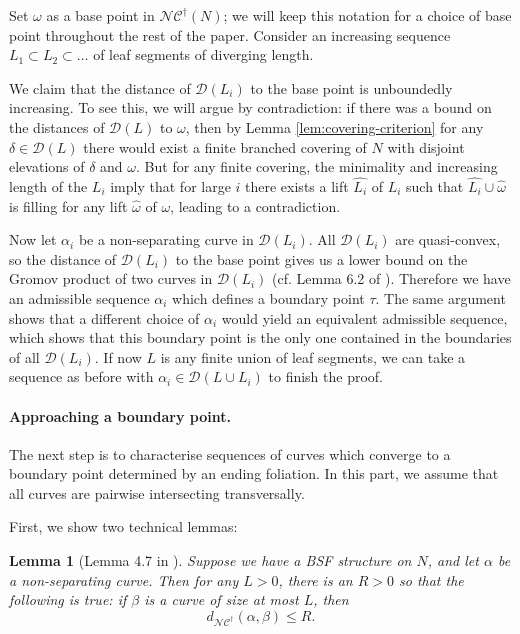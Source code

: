 \documentclass[a4paper]{article}
\newtheorem{lemma}[theorem]{Lemma}
\newcommand{\fncg}{\mathcal{NC}^\dagger}
\begin{document}
Set $\omega$ as a base point in $\fncg(N)$; 
we will keep this notation for a choice of base point throughout the rest of the paper.
Consider an increasing sequence $L_1 \subset L_2 \subset \dots$ of leaf segments of diverging length.

We claim that the distance of $\mathcal{D}(L_i)$ to the base point is unboundedly increasing.
To see this, we will argue by contradiction:
if there was a bound on the distances of $\mathcal{D}(L)$ to $\omega$, then by Lemma \ref{lem:covering-criterion} for any $ \delta \in \mathcal{D}(L) $ there would exist a finite branched covering of $N$ with disjoint elevations of $\delta$ and $\omega$.
But for any finite covering, the minimality and increasing length of the $L_i$ imply that for large $i$ there exists a lift $\hat{L_i}$ of $L_i$ such that $\hat{L_i}\cup \hat{\omega}$ is filling for any lift $\hat{\omega}$ of $\omega$, leading to a contradiction.

Now let $\alpha_i$ be a non-separating curve in $\mathcal{D}(L_i)$.
All $\mathcal{D}(L_i)$ are quasi-convex, so the distance of $\mathcal{D}(L_i)$ to the base point gives us a lower bound on the Gromov product of two curves in $\mathcal{D}(L_i)$ (cf. Lemma 6.2 of \cite{bowditch-notes}).
Therefore we have an admissible sequence $\alpha_i$ which defines a boundary point $\tau$.
The same argument shows that a different choice of $\alpha_i$ would yield an equivalent admissible sequence, which shows that this boundary point is the only one contained in the boundaries of all $\mathcal{D}(L_i)$.
If now $L$ is any finite union of leaf segments, we can take a sequence as before with $\alpha_i\in \mathcal{D}(L\cup L_i)$ to finish the proof.

\paragraph{Approaching a boundary point.}
The next step is to characterise sequences of curves which converge to a boundary point determined by an ending foliation.
In this part, we assume that all curves are pairwise intersecting transversally.

First, we show two technical lemmas:

\begin{lemma}[Lemma 4.7 in \cite{BHW2}]\label{lem:size-bounds-distance}
Suppose we have a BSF structure on $N$, and let $\alpha$ be a non-separating curve.
Then for any $L>0$, there is an $R>0$ so that the following is true:
if $\beta$ is a curve of size at most $L$, then 
\[ d_{\fncg}(\alpha,\beta) \leq R. \]
\end{lemma}
\end{document}
